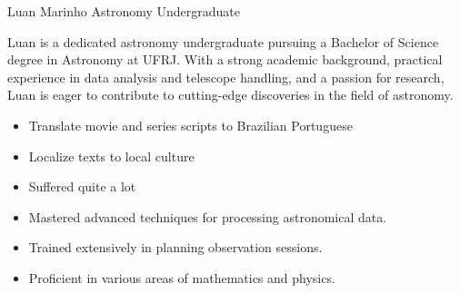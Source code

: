 \documentclass{article}
\begin{document}
\begin{cv}[avatar]{Luan Marinho }{Astronomy Undergraduate}


 Luan is a dedicated astronomy undergraduate pursuing a Bachelor of Science degree in Astronomy at UFRJ. With a strong academic background, practical experience in data analysis and telescope handling, and a passion for research, Luan is eager to contribute to cutting-edge discoveries in the field of astronomy.



\begin{cvevent}[present][2022]
    \begin{itemize}
        \item Translate movie and series scripts to Brazilian Portuguese 
        \item Localize texts to local culture
    \end{itemize}
\end{cvevent}


\begin{cvevent}[present][2026]
    \begin{itemize}
        \item Suffered quite a lot
    \end{itemize}
\end{cvevent}

\begin{cvevent}[present][2022]
    \begin{itemize}
        \item Mastered advanced techniques for processing astronomical data.
        \item Trained extensively in planning observation sessions.
        \item Proficient in various areas of mathematics and physics.
    \end{itemize}
\end{cvevent}




\end{cv}
\end{document}
